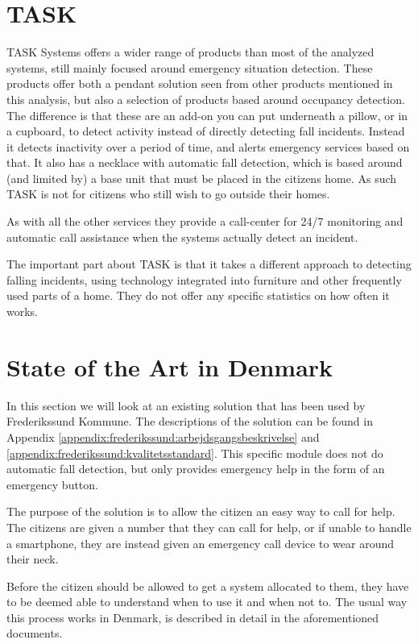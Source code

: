 \section{TASK}
TASK Systems offers a wider range of products than most of the analyzed systems, still mainly focused around emergency situation detection. These products offer both a pendant solution seen from other products mentioned in this analysis, but also a selection of products based around occupancy detection. The difference is that these are an add-on you can put underneath a pillow, or in a cupboard, to detect activity instead of directly detecting fall incidents. Instead it detects inactivity over a period of time, and alerts emergency services based on that. It also has a necklace with automatic fall detection, which is based around (and limited by) a base unit that must be placed in the citizens home. As such TASK is not for citizens who still wish to go outside their homes.

As with all the other services they provide a call-center for 24/7 monitoring and automatic call assistance when the systems actually detect an incident.

The important part about TASK is that it takes a different approach to detecting falling incidents, using technology integrated into furniture and other frequently used parts of a home. They do not offer any specific statistics on how often it works.

\section{State of the Art in Denmark}
In this section we will look at an existing solution that has been used by Frederikssund Kommune. The descriptions of the solution can be found in Appendix \ref{appendix:frederikssund:arbejdsgangsbeskrivelse} and \ref{appendix:frederikssund:kvalitetsstandard}. This specific module does not do automatic fall detection, but only provides emergency help in the form of an emergency button.

The purpose of the solution is to allow the citizen an easy way to call for help. The citizens are given a number that they can call for help, or if unable to handle a smartphone, they are instead given an emergency call device to wear around their neck.

Before the citizen should be allowed to get a system allocated to them, they have to be deemed able to understand when to use it and when not to. The usual way this process works in Denmark, is described in detail in the aforementioned documents.

